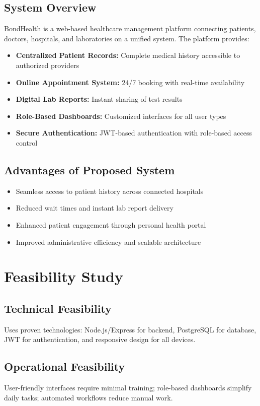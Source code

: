 \subsection{System Overview}
BondHealth is a web-based healthcare management platform connecting patients, doctors, hospitals, and laboratories on a unified system. The platform provides:
\begin{itemize}
    \item \textbf{Centralized Patient Records:} Complete medical history accessible to authorized providers
    \item \textbf{Online Appointment System:} 24/7 booking with real-time availability
    \item \textbf{Digital Lab Reports:} Instant sharing of test results
    \item \textbf{Role-Based Dashboards:} Customized interfaces for all user types
    \item \textbf{Secure Authentication:} JWT-based authentication with role-based access control
\end{itemize}

\subsection{Advantages of Proposed System}
\begin{itemize}
    \item Seamless access to patient history across connected hospitals
    \item Reduced wait times and instant lab report delivery
    \item Enhanced patient engagement through personal health portal
    \item Improved administrative efficiency and scalable architecture
\end{itemize}

\section{Feasibility Study}

\subsection{Technical Feasibility}
Uses proven technologies: Node.js/Express for backend, PostgreSQL for database, JWT for authentication, and responsive design for all devices.

\subsection{Operational Feasibility}
User-friendly interfaces require minimal training; role-based dashboards simplify daily tasks; automated workflows reduce manual work.

